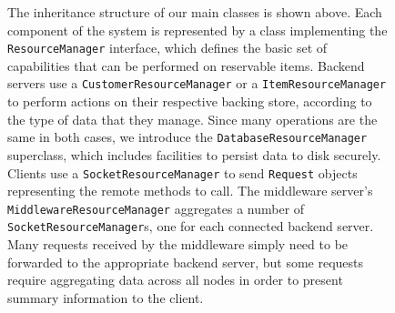 \documentclass[letterpaper,11pt]{article}
\makeatletter
\newenvironment{customlegend}[1][]{%
    \begingroup
    \csname pgfplots@init@cleared@structures\endcsname
    \pgfplotsset{#1}%
}{%
    \csname pgfplots@createlegend\endcsname
    \endgroup
}%
\def\addlegendimage{\csname pgfplots@addlegendimage\endcsname}
\makeatother
\begin{document}
\begin{figure}[H]
    \centering


    \caption{
        The inheritance structure of our main classes is shown above.
        Each component of the system is represented by a class implementing the
        \texttt{ResourceManager} interface, which defines the basic set of
        capabilities that can be performed on reservable items.
        Backend servers use a \texttt{CustomerResourceManager} or a
        \texttt{ItemResourceManager} to perform actions on their respective
        backing store,  according to the type of data that they manage.
        Since many operations are the same in both cases, we introduce the
        \texttt{DatabaseResourceManager} superclass, which includes facilities
        to persist data to disk securely.
        Clients use a \texttt{SocketResourceManager} to send \texttt{Request}
        objects representing the remote methods to call.
        The middleware server's \texttt{MiddlewareResourceManager} aggregates a
        number of \texttt{SocketResourceManager}s, one for each connected
        backend server. Many requests received by the middleware simply need
        to be forwarded to the appropriate backend server, but some requests
        require aggregating data across all nodes in order to present summary
        information to the client.
    }
\end{figure}
\end{document}
